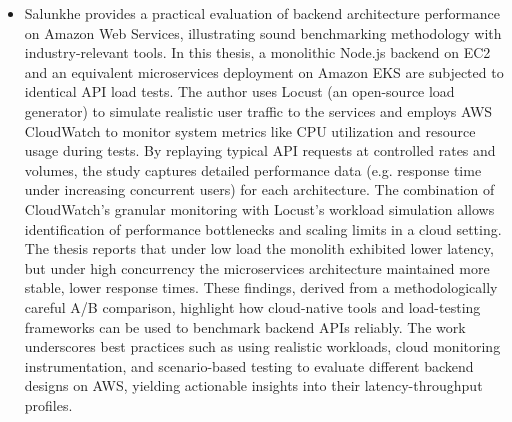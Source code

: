 \documentclass[11pt]{article}
\begin{document}
\begin{itemize}
\begin{itemize}
        \item[] Salunkhe provides a practical evaluation of backend architecture performance on Amazon Web Services, illustrating sound benchmarking methodology with industry-relevant tools. In this thesis, a monolithic Node.js backend on EC2 and an equivalent microservices deployment on Amazon EKS are subjected to identical API load tests. The author uses Locust (an open-source load generator) to simulate realistic user traffic to the services and employs AWS CloudWatch to monitor system metrics like CPU utilization and resource usage during tests. By replaying typical API requests at controlled rates and volumes, the study captures detailed performance data (e.g. response time under increasing concurrent users) for each architecture. The combination of CloudWatch’s granular monitoring with Locust’s workload simulation allows identification of performance bottlenecks and scaling limits in a cloud setting. The thesis reports that under low load the monolith exhibited lower latency, but under high concurrency the microservices architecture maintained more stable, lower response times. These findings, derived from a methodologically careful A/B comparison, highlight how cloud-native tools and load-testing frameworks can be used to benchmark backend APIs reliably. The work underscores best practices such as using realistic workloads, cloud monitoring instrumentation, and scenario-based testing to evaluate different backend designs on AWS, yielding actionable insights into their latency-throughput profiles.
    \end{itemize}
\end{itemize}
\end{document}
